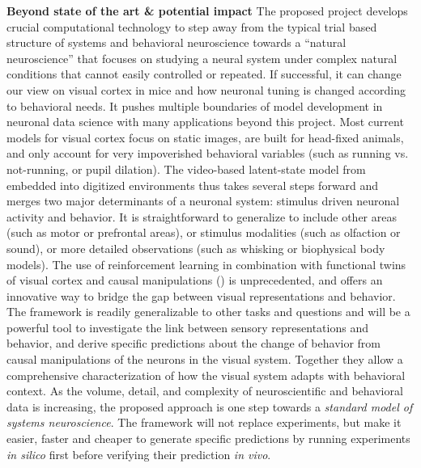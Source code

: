 \documentclass[B2,COG]{ercgrant}
\begin{document}
\textbf{Beyond state of the art \& potential impact} 
The proposed project develops crucial computational technology to step away from the typical trial based structure of systems and behavioral neuroscience towards a ``natural neuroscience'' that focuses on studying a neural system under complex natural conditions that cannot easily controlled or repeated. 
If successful, it can change our view on visual cortex in mice and how neuronal tuning is changed according to behavioral needs. 
It pushes multiple boundaries of model development in neuronal data science with many applications beyond this project.  Most current models for visual cortex focus on static images, are built for head-fixed animals, and only account for very impoverished behavioral variables (such as running vs. not-running, or pupil dilation). The video-based latent-state model from  embedded into digitized environments thus takes several steps forward and merges two major determinants of a neuronal system: stimulus driven neuronal activity and behavior. It is straightforward to generalize to include other areas (such as motor or prefrontal areas), or stimulus modalities (such as olfaction or sound), or more detailed observations (such as whisking or biophysical body models). 
 The use of reinforcement learning in combination with functional twins of visual cortex and causal manipulations () is unprecedented, and offers an innovative way to bridge the gap between visual representations and behavior. The framework is readily generalizable to other tasks and questions and will be a powerful tool to investigate the link between sensory representations and behavior, and derive specific predictions about the change of behavior from causal manipulations of the neurons in the visual system.
 Together they allow a comprehensive characterization of how the visual system adapts with behavioral context. As the volume, detail, and complexity of neuroscientific and behavioral data is increasing, the proposed approach is one step towards a \textit{standard model of systems neuroscience}.
The framework will not replace experiments, but make it easier, faster and cheaper to generate specific predictions by running experiments \textit{in silico} first before verifying their prediction \textit{in vivo}.
\end{document}
